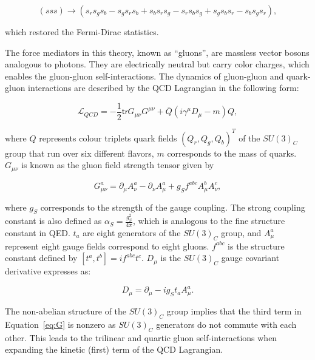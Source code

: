 \begin{equation}
(sss)\rightarrow(s_{r}s_{g}s_{b}-s_{g}s_{r}s_{b}+s_{b}s_{r}s_{g}-s_{r}s_{b}s_{g}+s_{g}s_{b}s_{r}-s_{b}s_{g}s_{r}),
\end{equation}

which restored the Fermi-Dirac statistics.  

The force mediators in this theory, known as ``gluons'', are massless vector bosons analogous to photons. They are electrically neutral but carry color charges, which enables the gluon-gluon self-interactions. The dynamics of gluon-gluon and quark-gluon interactions are described by the \ac{QCD} Lagrangian in the following form:

\begin{equation}
\mathcal{L}_{QCD}=-\frac{1}{2}\textsf{tr}G_{\mu\nu}G^{\mu\nu}+\bar{Q}(i\gamma^{\mu}D_{\mu}-m)Q,
\end{equation}

where $Q$ represents colour triplets quark fields $(Q_{r},Q_{g},Q_{b})^{T}$ of the $SU(3)_{C}$ group that run over six different flavors, $m$ corresponds to the mass of quarks. $G_{\mu\nu}$ is known as the gluon field strength tensor given by

\begin{equation}
\label{eq:G}
G_{\mu\nu}^{a}=\partial_{\mu}A_{\nu}^{a}-\partial_{\nu}A_{\mu}^{a}+g_{S}f^{abc}A_{\mu}^{b}A_{\nu}^{c},
\end{equation}

where $g_{S}$ corresponds to the strength of the gauge coupling. The strong coupling constant is also defined as $\alpha_{S}=\frac{g_{S}^2}{4\pi}$, which is analogous to the fine structure constant in \ac{QED}. $t_{a}$ are eight generators of the $SU(3)_{C}$ group, and $A^{a}_{\mu}$ represent eight gauge fields correspond to eight gluons. $f^{abc}$ is the structure constant defined by $[t^{a},t^{b}]=if^{abc}t^{c}$. $D_{\mu}$ is the $SU(3)_{C}$ gauge covariant derivative expresses as:

\begin{equation}
D_{\mu}=\partial_{\mu}-ig_{S}t_{a}A^{a}_{\mu}.
\end{equation}

The non-abelian structure of the $SU(3)_{C}$ group implies that the third term in Equation~\ref{eq:G} is nonzero as  $SU(3)_{C}$ generators do not commute with each other. This leads to the trilinear and quartic gluon self-interactions when expanding the kinetic (first) term of the QCD Lagrangian. 

